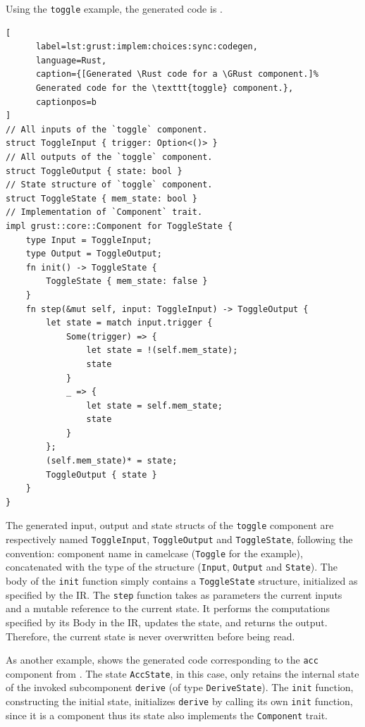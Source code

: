 Using the \texttt{toggle} example, the generated code is .
\begin{lstlisting}[
      label=lst:grust:implem:choices:sync:codegen,
      language=Rust,
      caption={[Generated \Rust code for a \GRust component.]%
      Generated code for the \texttt{toggle} component.}, 
      captionpos=b
]
// All inputs of the `toggle` component.
struct ToggleInput { trigger: Option<()> }
// All outputs of the `toggle` component.
struct ToggleOutput { state: bool }
// State structure of `toggle` component.
struct ToggleState { mem_state: bool }
// Implementation of `Component` trait.
impl grust::core::Component for ToggleState {
    type Input = ToggleInput;
    type Output = ToggleOutput;
    fn init() -> ToggleState {
        ToggleState { mem_state: false }
    }
    fn step(&mut self, input: ToggleInput) -> ToggleOutput {
        let state = match input.trigger {
            Some(trigger) => {
                let state = !(self.mem_state);
                state
            }
            _ => {
                let state = self.mem_state;
                state
            }
        };
        (self.mem_state)* = state;
        ToggleOutput { state }
    }
}
\end{lstlisting}
The generated input, output and state structs of the \texttt{toggle} component are respectively
named \texttt{ToggleInput}, \texttt{ToggleOutput} and \texttt{ToggleState}, following the
convention: component name in camelcase (\texttt{Toggle} for the example), concatenated with the
type of the structure (\texttt{Input}, \texttt{Output} and \texttt{State}).
%
The body of the \texttt{init} function simply contains a \texttt{ToggleState} structure, initialized
as specified by the IR.
%
The \texttt{step} function takes as parameters the current inputs and a mutable reference to the
current state. It performs the computations specified by its Body in the IR, updates the state, and
returns the output. Therefore, the current state is never overwritten before being read.

As another example,  shows the generated \Rust code
corresponding to the \texttt{acc} component from . The state \texttt{AccState},
in this case, only retains the internal state of the invoked subcomponent \texttt{derive} (of type
\texttt{DeriveState}). The \texttt{init} function, constructing the initial state, initializes
\texttt{derive} by calling its own \texttt{init} function, since it is a component thus its state
also implements the \texttt{Component} trait.

